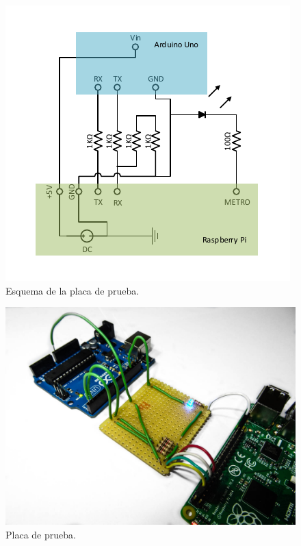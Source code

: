 \begin{figure}[H]
	\noindent \begin{centering}
		\includegraphics[width=\linewidth/2]{capitulo6/proto_esquema}
		\par\end{centering}
	\smallskip
	\caption{\label{fig:proto_esquema} Esquema de la placa de prueba.}
\end{figure} 

\smallskip

\smallskip

\begin{figure}[H]
	\noindent \begin{centering}
		\includegraphics[width=\linewidth*2/3]{capitulo6/proto_uart}
		\par\end{centering}
	\smallskip
	\caption{\label{fig:proto_uart} Placa de prueba.}
\end{figure} 

